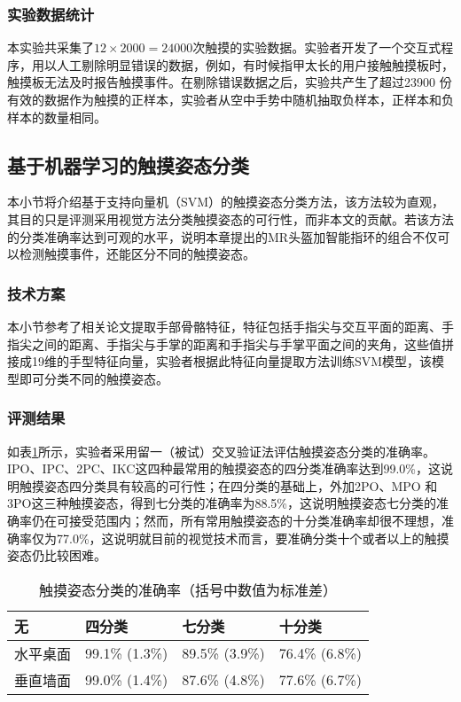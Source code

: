 \subsubsection{实验数据统计}

本实验共采集了$12\times2000=24000$次触摸的实验数据。实验者开发了一个交互式程序，用以人工剔除明显错误的数据，例如，有时候指甲太长的用户接触触摸板时，触摸板无法及时报告触摸事件。在剔除错误数据之后，实验共产生了超过23900 份有效的数据作为触摸的正样本，实验者从空中手势中随机抽取负样本，正样本和负样本的数量相同。

\subsection{基于机器学习的触摸姿态分类}

本小节将介绍基于支持向量机（SVM）的触摸姿态分类方法，该方法较为直观，其目的只是评测采用视觉方法分类触摸姿态的可行性，而非本文的贡献。若该方法的分类准确率达到可观的水平，说明本章提出的MR头盔加智能指环的组合不仅可以检测触摸事件，还能区分不同的触摸姿态。

\subsubsection{技术方案}

本小节参考了相关论文\cite{de2016skeleton}提取手部骨骼特征，特征包括手指尖与交互平面的距离、手指尖之间的距离、手指尖与手掌的距离和手指尖与手掌平面之间的夹角，这些值拼接成19维的手型特征向量，实验者根据此特征向量提取方法训练SVM模型，该模型即可分类不同的触摸姿态。

\subsubsection{评测结果}

如表\ref{tab:posture_accuracy}所示，实验者采用留一（被试）交叉验证法评估触摸姿态分类的准确率。IPO、IPC、2PC、IKC这四种最常用的触摸姿态的四分类准确率达到99.0\%，这说明触摸姿态四分类具有较高的可行性；在四分类的基础上，外加2PO、MPO 和 3PO这三种触摸姿态，得到七分类的准确率为88.5\%，这说明触摸姿态七分类的准确率仍在可接受范围内；然而，所有常用触摸姿态的十分类准确率却很不理想，准确率仅为77.0\%，这说明就目前的视觉技术而言，要准确分类十个或者以上的触摸姿态仍比较困难。

\begin{table}
	\centering
	\caption{触摸姿态分类的准确率（括号中数值为标准差）}
	\begin{tabular}{llll}
		\toprule
		无 & 四分类 & 七分类  & 十分类 \\
		\midrule
		水平桌面 & 99.1\% (1.3\%) & 89.5\% (3.9\%) & 76.4\% (6.8\%) \\
		垂直墙面 & 99.0\% (1.4\%) & 87.6\% (4.8\%) & 77.6\% (6.7\%) \\
		\bottomrule
	\end{tabular}
	\label{tab:posture_accuracy}
\end{table}

